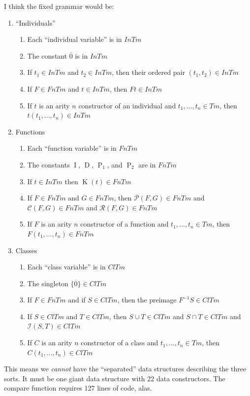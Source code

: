 \begin{node}
I think the fixed grammar would be:
\begin{enumerate}
\item ``Individuals''
\begin{enumerate}
\item Each ``individual variable'' is in $\textit{InTm}$
\item The constant $\overline{0}$ is in $\textit{InTm}$
\item If $t_{1}\in\textit{InTm}$ and $t_{2}\in\textit{InTm}$, then
  their ordered pair $(t_{1},t_{2})\in\textit{InTm}$
\item If $F\in\textit{FnTm}$ and $t\in\textit{InTm}$, then $Ft\in\textit{InTm}$
\item If $t$ is an arity $n$ constructor of an individual and
  $t_{1},\dots,t_{n}\in\textit{Tm}$, then $t(t_{1},\dots,t_{n})\in\textit{InTm}$
\end{enumerate}
\item Functions
\begin{enumerate}
\item Each ``function variable'' is in $\textit{FnTm}$
\item The constants $\operatorname{I}$, $\operatorname{D}$,
  $\operatorname{P}_{1}$, and $\operatorname{P}_{2}$ are in $\textit{FnTm}$
\item If $t\in\textit{InTm}$ then $\operatorname{K}(t)\in\textit{FnTm}$
\item If $F\in\textit{FnTm}$ and $G\in\textit{FnTm}$, then
  $\mathcal{P}(F,G)\in\textit{FnTm}$ and
  $\mathcal{C}(F,G)\in\textit{FnTm}$ and $\mathcal{R}(F,G)\in\textit{FnTm}$
\item If $F$ is an arity $n$ constructor of a function and
  $t_{1},\dots,t_{n}\in\textit{Tm}$, then $F(t_{1},\dots,t_{n})\in\textit{FnTm}$
\end{enumerate}
\item Classes
\begin{enumerate}
\item Each ``class variable'' is in $\textit{ClTm}$
\item The singleton $\{\overline{0}\}\in\textit{ClTm}$
\item If $F\in\textit{FnTm}$ and if $S\in\textit{ClTm}$, then the
  preimage $F^{-1}S\in\textit{ClTm}$
\item If $S\in\textit{ClTm}$ and $T\in\textit{ClTm}$, then $S\cup T\in\textit{ClTm}$
  and $S\cap T\in\textit{ClTm}$ and $\mathcal{I}(S,T)\in\textit{ClTm}$
\item If $C$ is an arity $n$ constructor of a class and
  $t_{1},\dots,t_{n}\in\textit{Tm}$, then $C(t_{1},\dots,t_{n})\in\textit{ClTm}$
\end{enumerate}
\end{enumerate}
This means we \emph{cannot} have the ``separated'' data structures describing
the three sorts. It must be one giant data structure with 22 data constructors.
The {\Tt{}compare\nwendquote} function requires 127 lines of code, alas.
\end{node}

